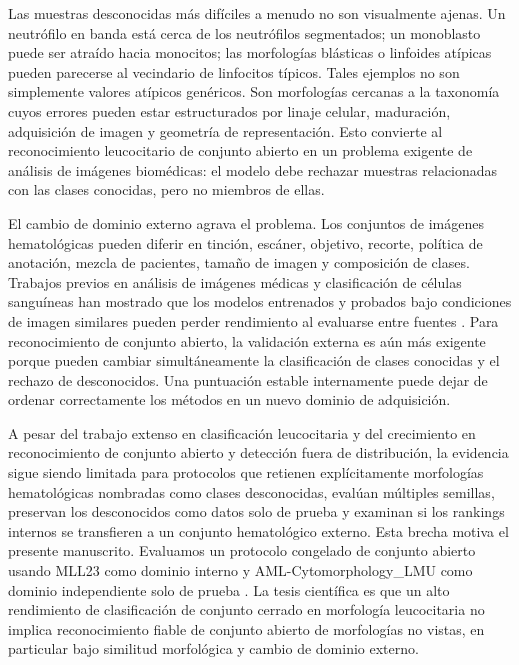 \documentclass[11pt]{article}
\begin{document}
Las muestras desconocidas más difíciles a menudo no son visualmente ajenas. Un neutrófilo en banda está cerca de los neutrófilos segmentados; un monoblasto puede ser atraído hacia monocitos; las morfologías blásticas o linfoides atípicas pueden parecerse al vecindario de linfocitos típicos. Tales ejemplos no son simplemente valores atípicos genéricos. Son morfologías cercanas a la taxonomía cuyos errores pueden estar estructurados por linaje celular, maduración, adquisición de imagen y geometría de representación. Esto convierte al reconocimiento leucocitario de conjunto abierto en un problema exigente de análisis de imágenes biomédicas: el modelo debe rechazar muestras relacionadas con las clases conocidas, pero no miembros de ellas.

El cambio de dominio externo agrava el problema. Los conjuntos de imágenes hematológicas pueden diferir en tinción, escáner, objetivo, recorte, política de anotación, mezcla de pacientes, tamaño de imagen y composición de clases. Trabajos previos en análisis de imágenes médicas y clasificación de células sanguíneas han mostrado que los modelos entrenados y probados bajo condiciones de imagen similares pueden perder rendimiento al evaluarse entre fuentes \cite{guan2022_domain_adaptation_medical,litjens2017_medical_ai_survey,salehi2022_cross_domain,sadafi2024_continual_wbc,tsutsui2023_wbc_domain_shift}. Para reconocimiento de conjunto abierto, la validación externa es aún más exigente porque pueden cambiar simultáneamente la clasificación de clases conocidas y el rechazo de desconocidos. Una puntuación estable internamente puede dejar de ordenar correctamente los métodos en un nuevo dominio de adquisición.

A pesar del trabajo extenso en clasificación leucocitaria y del crecimiento en reconocimiento de conjunto abierto y detección fuera de distribución, la evidencia sigue siendo limitada para protocolos que retienen explícitamente morfologías hematológicas nombradas como clases desconocidas, evalúan múltiples semillas, preservan los desconocidos como datos solo de prueba y examinan si los rankings internos se transfieren a un conjunto hematológico externo. Esta brecha motiva el presente manuscrito. Evaluamos un protocolo congelado de conjunto abierto usando MLL23 como dominio interno y AML-Cytomorphology\_LMU como dominio independiente solo de prueba \cite{mll23_nature_2025,mll23_zenodo_2024,aml_lmu_tcia_2019}. La tesis científica es que un alto rendimiento de clasificación de conjunto cerrado en morfología leucocitaria no implica reconocimiento fiable de conjunto abierto de morfologías no vistas, en particular bajo similitud morfológica y cambio de dominio externo.
\end{document}
